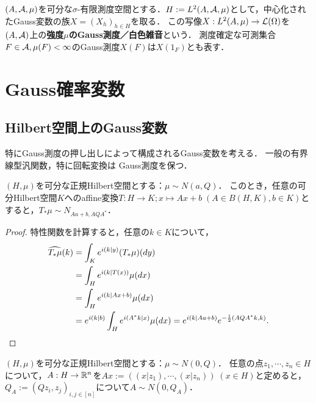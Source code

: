 \documentclass[uplatex,dvipdfmx]{jsreport}
\begin{document}
\begin{definition}
    $(A,\mathcal{A},\mu)$を可分な$\sigma$-有限測度空間とする．$H:=L^2(A,\mathcal{A},\mu)$として，中心化されたGauss変数の族$X=(X_h)_{h\in H}$を取る．
    この写像$X:L^2(A,\mu)\to\mathcal{L}(\Omega)$を$(A,\mathcal{A})$上の\textbf{強度$\mu$のGauss測度／白色雑音}という．
    測度確定な可測集合$F\in\mathcal{A},\mu(F)<\infty$のGauss測度$X(F)$は$X(1_F)$とも表す．
\end{definition}



\section{Gauss確率変数}

\subsection{Hilbert空間上のGauss変数}

\begin{tcolorbox}[colframe=ForestGreen, colback=ForestGreen!10!white,breakable,colbacktitle=ForestGreen!40!white,coltitle=black,fonttitle=\bfseries\sffamily,
title=]
    特にGauss測度の押し出しによって構成されるGauss変数を考える．
    一般の有界線型汎関数，特に回転変換は
    Gauss測度を保つ．
\end{tcolorbox}

\begin{proposition}[有界線型汎関数はGauss測度を保つ]
    $(H,\mu)$を可分な正規Hilbert空間とする：$\mu\sim N(a,Q)$．
    このとき，任意の可分Hilbert空間$K$へのaffine変換$T:H\to K;x\mapsto Ax+b\;(A\in B(H,K),b\in K)$とすると，$T_*\mu\sim N_{Aa+b,AQA^*}$．
\end{proposition}
\begin{proof}
    特性関数を計算すると，任意の$k\in K$について，
    \begin{align*}
        \widehat{T_*\mu}(k)&=\int_K e^{i(k|y)}(T_*\mu)(dy)\\
        &=\int_He^{i(k|T(x))}\mu(dx)\\
        &=\int_He^{i(k|Ax+b)}\mu(dx)\\
        &=e^{i(k|b)}\int_He^{i(A^*k|x)}\mu(dx)=e^{i(k|Aa+b)}e^{-\frac{1}{2}(AQA^*k,k)}.
    \end{align*}
\end{proof}

\begin{corollary}
    $(H,\mu)$を可分な正規Hilbert空間とする：$\mu\sim N(0,Q)$．
    任意の点$z_1,\cdots,z_n\in H$について，$A:H\to\mathbb{R}^n$を$Ax:=((x|z_1),\cdots,(x|z_n))\;(x\in H)$と定めると，
    $Q_A:=(Qz_i,z_j)_{i,j\in[n]}$について$A\sim N(0,Q_A)$．
\end{corollary}
\end{document}
